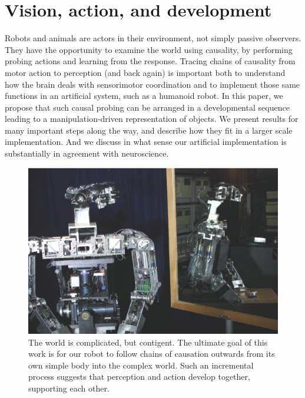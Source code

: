
\section{Vision, action, and development}

Robots and animals are actors in their environment, not simply passive
observers.  They have the opportunity to examine the world using
causality, by performing probing actions and learning from the
response.  
Tracing chains of causality from motor action to perception
(and back again) is important both to understand how the brain deals
with sensorimotor coordination and to implement those same functions
in an artificial system, such as a humanoid robot.
In this paper, we propose that such causal probing can be arranged in
a developmental sequence leading to a manipulation-driven
representation of objects.  We present results for many important steps
along the way, and describe how they fit in a larger scale implementation.
And we discuss in what sense our artificial implementation is substantially 
in agreement with neuroscience. 


\begin{figure}[tbh]
\begin{center}
\includegraphics[width=12cm]{mirror-cog.eps}
\caption{ 
\label{fig:mirror-cog}
%
The world is complicated, but contigent.
The ultimate goal of this work is for our robot to follow chains of
causation outwards from its own simple body into the complex world.
Such an incremental process suggests that perception and action
develop together, supporting each other.
%
}
\end{center}
\end{figure}

